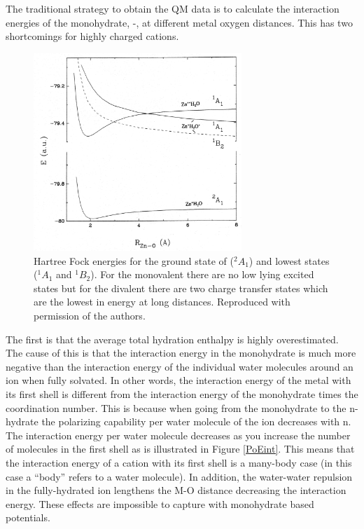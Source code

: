 The traditional strategy to obtain the QM data is to calculate the 
interaction energies of the monohydrate, -, at different metal oxygen 
distances. This has two shortcomings for highly charged cations. 

\begin{figure}
     \centering
         \includegraphics[width=0.7\textwidth]{images/ZnQM} 
        \caption[Charge transfer in ]{Hartree Fock energies for the ground 
state 
of  \ce{[Zn*(H2O)]^{+}} ($^2A_1$) and 
\ce{[Zn*(H2O)]^{2+}]} lowest states ($^1A_1$ and $^1B_2$). For the monovalent there are no low 
lying excited states but for the divalent there are two charge transfer states which are the lowest 
in energy at long distances. Reproduced with permission of the 
authors\cite{JPhysChem_ESM_1992}.}
        \label{ZnQM}
\end{figure}

The first is that the average total hydration enthalpy is highly overestimated. The cause of 
this is that the interaction energy in the monohydrate is much more 
negative than the interaction energy of the individual water molecules around an ion when 
fully solvated. In other words, the interaction energy of the metal with its first shell 
is different from the interaction energy of the monohydrate times the coordination number. 
This is because when going from the monohydrate to the n-hydrate the polarizing 
capability per water molecule of the ion decreases with n. The 
interaction energy per water molecule decreases as you increase the number of molecules in the 
first shell as is illustrated in Figure \ref{PoEint}. This means that the interaction energy of 
a cation with its 
first shell is a many-body case (in this case a ``body'' refers to a water molecule). In 
addition, 
the water-water repulsion in the fully-hydrated ion lengthens the M-O distance decreasing the 
interaction energy. These effects are impossible to capture with monohydrate based 
potentials.\cite{curtiss1987nonadditivity,JPhysChemA_ESM_2000}

